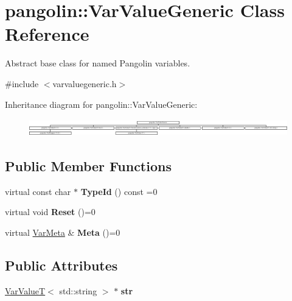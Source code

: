 \hypertarget{classpangolin_1_1_var_value_generic}{}\section{pangolin\+:\+:Var\+Value\+Generic Class Reference}
\label{classpangolin_1_1_var_value_generic}


Abstract base class for named Pangolin variables.  




{\ttfamily \#include $<$varvaluegeneric.\+h$>$}

Inheritance diagram for pangolin\+:\+:Var\+Value\+Generic\+:\begin{figure}[H]
\begin{center}
\leavevmode
\includegraphics[height=0.760870cm]{classpangolin_1_1_var_value_generic}
\end{center}
\end{figure}
\subsection*{Public Member Functions}
\begin{DoxyCompactItemize}
\item 
virtual const char $\ast$ {\bfseries Type\+Id} () const =0\hypertarget{classpangolin_1_1_var_value_generic_a835abd89f6b117e4e1de2b2595229d0d}{}\label{classpangolin_1_1_var_value_generic_a835abd89f6b117e4e1de2b2595229d0d}

\item 
virtual void {\bfseries Reset} ()=0\hypertarget{classpangolin_1_1_var_value_generic_a42ee2f6ad7b9031937111fedfb02b566}{}\label{classpangolin_1_1_var_value_generic_a42ee2f6ad7b9031937111fedfb02b566}

\item 
virtual \hyperlink{structpangolin_1_1_var_meta}{Var\+Meta} \& {\bfseries Meta} ()=0\hypertarget{classpangolin_1_1_var_value_generic_a482a33847c8b7bf5385812b0d4c30758}{}\label{classpangolin_1_1_var_value_generic_a482a33847c8b7bf5385812b0d4c30758}

\end{DoxyCompactItemize}
\subsection*{Public Attributes}
\begin{DoxyCompactItemize}
\item 
\hyperlink{classpangolin_1_1_var_value_t}{Var\+ValueT}$<$ std\+::string $>$ $\ast$ {\bfseries str}\hypertarget{classpangolin_1_1_var_value_generic_afa43ae3130acb308f60fd8c56889a37a}{}\label{classpangolin_1_1_var_value_generic_afa43ae3130acb308f60fd8c56889a37a}

\end{DoxyCompactItemize}


